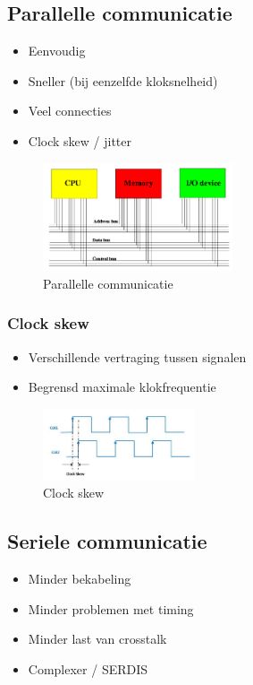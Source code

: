 \documentclass{article}
\begin{document}
\subsection{Parallelle communicatie}
\begin{itemize}
    \item Eenvoudig
    \item Sneller (bij eenzelfde kloksnelheid)
    \item Veel connecties
    \item Clock skew / jitter
\end{itemize}

\begin{figure}[H]
    \centering
    \includegraphics[width=0.5\textwidth]{Screenshot_20200323_114732.png}
    \caption{Parallelle communicatie}
\end{figure}

\subsubsection{Clock skew}
\begin{itemize}
    \item Verschillende vertraging tussen signalen
    \item Begrensd maximale klokfrequentie
\end{itemize}

\begin{figure}[H]
    \centering
    \includegraphics[width=0.4\textwidth]{Screenshot_20200323_114937.png}
    \caption{Clock skew}
\end{figure}

\subsection{Seriele communicatie}
\begin{itemize}
    \item Minder bekabeling
    \item Minder problemen met timing
    \item Minder last van crosstalk
    \item Complexer / SERDIS
\end{itemize}
\end{document}
